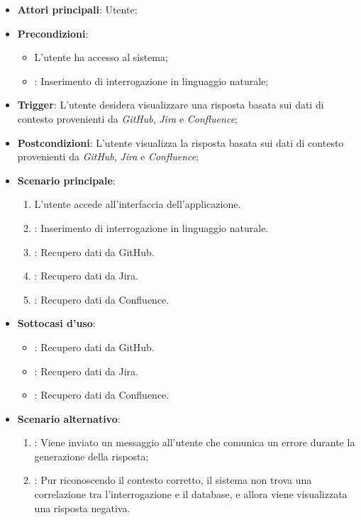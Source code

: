 \begin{itemize}
    \item \textbf{Attori principali}: Utente;
    \item \textbf{Precondizioni}: 
    \begin{itemize}
        \item L'utente ha accesso al sistema;
        \item {}: Inserimento di interrogazione in linguaggio naturale;
    \end{itemize}
    \item \textbf{Trigger}: L'utente desidera visualizzare una risposta basata sui dati di contesto provenienti da \emph{GitHub}, \emph{Jira} e \emph{Confluence};
    \item \textbf{Postcondizioni}: L'utente visualizza la risposta basata sui dati di contesto provenienti da \emph{GitHub}, \emph{Jira} e \emph{Confluence};
    \item \textbf{Scenario principale}:
    \begin{enumerate}
        \item L'utente accede all'interfaccia dell'applicazione.
        \item {}: Inserimento di interrogazione in linguaggio naturale.
        \item {}: Recupero dati da GitHub.
        \item {}: Recupero dati da Jira.
        \item {}: Recupero dati da Confluence.
    \end{enumerate}
    \item \textbf{Sottocasi d'uso}:
    \begin{itemize}
        \item {}: Recupero dati da GitHub.
        \item {}: Recupero dati da Jira.
        \item {}: Recupero dati da Confluence.
    \end{itemize}
    \item \textbf{Scenario alternativo}:
    \begin{enumerate}
        \item {}: Viene inviato un messaggio all'utente che comunica un errore durante la generazione della risposta;
        \item {}: Pur riconoscendo il contesto corretto, il sistema non trova una correlazione tra l'interrogazione e il database, e allora viene visualizzata una risposta negativa.
    \end{enumerate}
\end{itemize}

